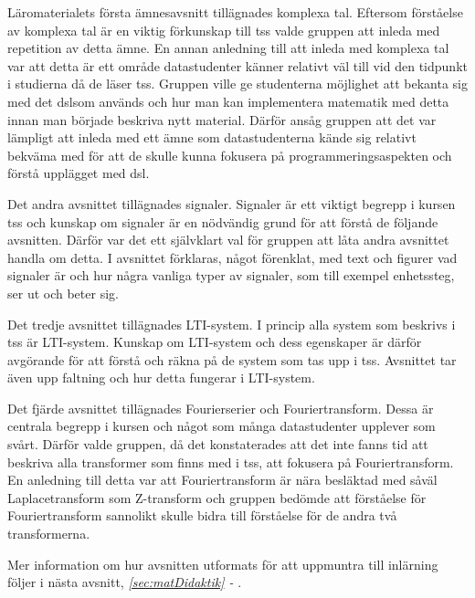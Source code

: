 \documentclass[12pt,a4paper,twoside,openright]{article}
\begin{document}
Läromaterialets första ämnesavsnitt tillägnades komplexa tal. Eftersom
förståelse av komplexa tal är en viktig förkunskap till \gls{tss}
valde gruppen att inleda med repetition av detta ämne. En annan
anledning till att inleda med komplexa tal var att detta är ett område
datastudenter känner relativt väl till vid den tidpunkt i studierna då
de läser \gls{tss}. Gruppen ville ge studenterna möjlighet att
bekanta sig med det \gls{dsl}som används och hur man kan implementera
matematik med detta innan man började beskriva nytt material. Därför
ansåg gruppen att det var lämpligt att inleda med ett ämne som
datastudenterna kände sig relativt bekväma med för att de skulle kunna
fokusera på programmeringsaspekten och förstå upplägget med \gls{dsl}.

Det andra avsnittet tillägnades signaler. Signaler är ett viktigt
begrepp i kursen \gls{tss} och kunskap om signaler är en nödvändig
grund för att förstå de följande avsnitten. Därför var det ett
självklart val för gruppen att låta andra avsnittet handla om detta. I
avsnittet förklaras, något förenklat, med text och figurer vad
signaler är och hur några vanliga typer av signaler, som till exempel
enhetssteg, ser ut och beter sig.

Det tredje avsnittet tillägnades LTI-system. I princip alla system som
beskrivs i \gls{tss} är LTI-system. Kunskap om LTI-system och dess
egenskaper är därför avgörande för att förstå och räkna på de system
som tas upp i \gls{tss}. Avsnittet tar även upp faltning och hur
detta fungerar i LTI-system.

Det fjärde avsnittet tillägnades Fourierserier och
Fouriertransform. Dessa är centrala begrepp i kursen och något som
många datastudenter upplever som svårt. Därför valde gruppen, då det
konstaterades att det inte fanns tid att beskriva alla transformer som
finns med i \gls{tss}, att fokusera på Fouriertransform. En
anledning till detta var att Fouriertransform är nära besläktad med
såväl Laplacetransform som Z-transform och gruppen bedömde att
förståelse för Fouriertransform sannolikt skulle bidra till förståelse
för de andra två transformerna.

Mer information om hur avsnitten utformats för att uppmuntra till
inlärning följer i nästa avsnitt, \textit{\ref{sec:matDidaktik} -
  }.
\end{document}
